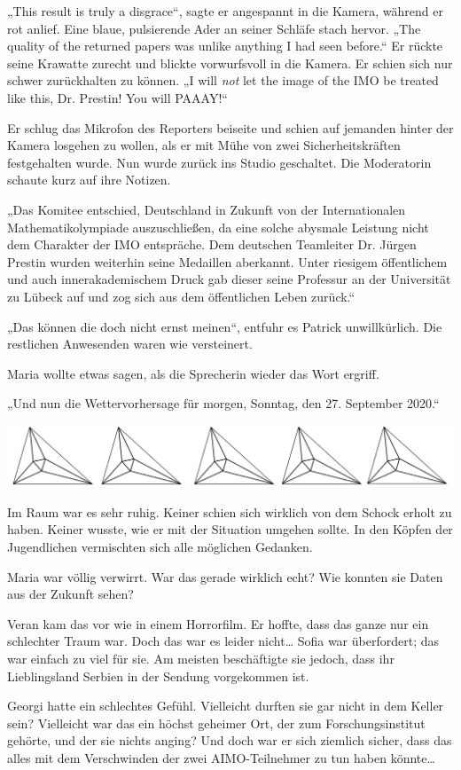 \documentclass[oneside]{memoir}
\newcommand{\parasep}{
\bigskip
\bigskip
\begin{center} 
   \includegraphics[scale=.08]{parasep5.jpg} 
\end{center}
\bigskip
\bigskip
}
\begin{document}
„This result is truly a disgrace“, sagte er angespannt in die Kamera, während er rot anlief. Eine blaue, pulsierende Ader an seiner Schläfe stach hervor. „The quality of the returned papers was unlike anything I had seen before.“ Er rückte seine Krawatte zurecht und blickte vorwurfsvoll in die Kamera. Er schien sich nur schwer zurückhalten zu können. „I will \textit{not} let the image of the IMO be treated like this, Dr. Prestin! You will PAAAY!“

Er schlug das Mikrofon des Reporters beiseite und schien auf jemanden hinter der Kamera losgehen zu wollen, als er mit Mühe von zwei Sicherheitskräften festgehalten wurde. Nun wurde zurück ins Studio geschaltet. Die Moderatorin schaute kurz auf ihre Notizen.

„Das Komitee entschied, Deutschland in Zukunft von der Internationalen Mathematikolympiade auszuschließen, da eine solche abysmale Leistung nicht dem Charakter der IMO entspräche. Dem deutschen Teamleiter Dr. Jürgen Prestin wurden weiterhin seine Medaillen aberkannt. Unter riesigem öffentlichem und auch innerakademischem Druck gab dieser seine Professur an der Universität zu Lübeck auf und zog sich aus dem öffentlichen Leben zurück.“

„Das können die doch nicht ernst meinen“, entfuhr es Patrick unwillkürlich. Die restlichen Anwesenden waren wie versteinert.

Maria wollte etwas sagen, als die Sprecherin wieder das Wort ergriff.

„Und nun die Wettervorhersage für morgen, Sonntag, den 27. September 2020.“

     
     \parasep
     
Im Raum war es sehr ruhig. Keiner schien sich wirklich von dem Schock erholt zu haben. Keiner wusste, wie er mit der Situation umgehen sollte.
In den Köpfen der Jugendlichen vermischten sich alle möglichen Gedanken.

Maria war völlig verwirrt. War das gerade wirklich echt? Wie konnten sie Daten aus der Zukunft sehen?

Veran kam das vor wie in einem Horrorfilm. Er hoffte, dass das ganze nur ein schlechter Traum war. Doch das war es leider nicht\ldots{} Sofia war überfordert; das war einfach zu viel für sie. Am meisten beschäftigte sie jedoch, dass ihr Lieblingsland Serbien in der Sendung vorgekommen ist.

Georgi hatte ein schlechtes Gefühl. Vielleicht durften sie gar nicht in dem Keller sein? Vielleicht war das ein höchst geheimer Ort, der zum Forschungsinstitut gehörte, und der sie nichts anging? Und doch war er sich ziemlich sicher, dass das alles mit dem Verschwinden der zwei AIMO-Teilnehmer zu tun haben könnte\ldots
\end{document}
